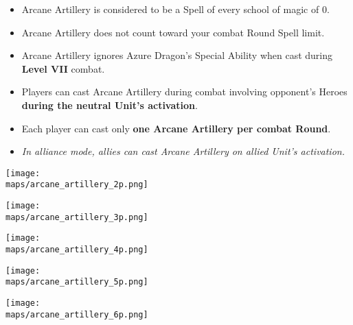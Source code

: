 \begin{multicols}{2}
\begin{itemize}
  \item Arcane Artillery is considered to be a Spell of every school of magic of  0.
  \item Arcane Artillery does not count toward your combat Round Spell limit.
  \item Arcane Artillery ignores Azure Dragon's Special Ability when cast during \textbf{Level VII} combat.
  \item Players can cast Arcane Artillery during combat involving opponent's Heroes \textbf{during the neutral Unit's activation}.
  \item Each player can cast only \textbf{one Arcane Artillery per combat Round}.
  \item \textit{In alliance mode, allies can cast Arcane Artillery on allied Unit's activation.}
\end{itemize}

\end{multicols}

\newpage

  \begin{minipage}{0.4\paperwidth}
    \centering
    \texttt{[image: \\maps/arcane\_artillery\_2p.png]}
  \end{minipage}
  \vspace{1em}
  \linebreak
  \begin{minipage}{0.4\paperwidth}
    \centering
    \texttt{[image: \\maps/arcane\_artillery\_3p.png]}
  \end{minipage}
  \begin{minipage}{0.4\paperwidth}
    \centering
    \texttt{[image: \\maps/arcane\_artillery\_4p.png]}
  \end{minipage}
  \vspace{1em}
  \linebreak
  \begin{minipage}{0.4\paperwidth}
    \centering
    \texttt{[image: \\maps/arcane\_artillery\_5p.png]}
  \end{minipage}
  \begin{minipage}{0.4\paperwidth}
    \centering
    \texttt{[image: \\maps/arcane\_artillery\_6p.png]}
  \end{minipage}
